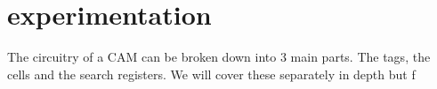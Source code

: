 \section{experimentation}
The circuitry of a CAM can be broken down into 3 main parts. The tags, the cells and the search registers. 
We will cover these separately in depth but f
